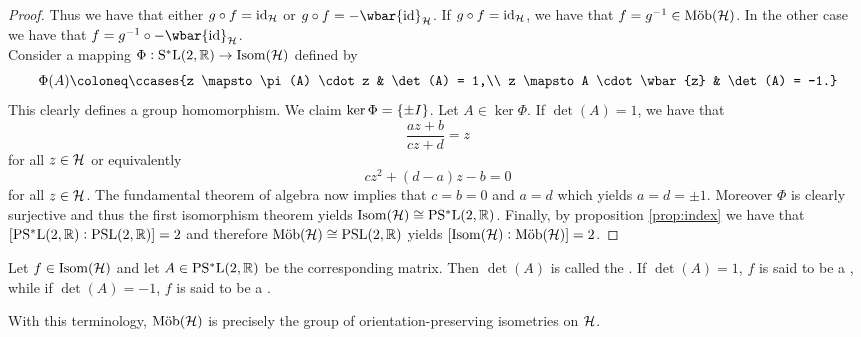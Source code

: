 \begin{proof}
	Thus we have that either $g \circ f = \operatorname{id}_{\mathcal{H}}$ or $g \circ f = -\wbar{\id}_\Hcal$. If $g \circ f = \operatorname{id}_{\mathcal{H}}$, we have that $f = g^{-1} \in \mathrm{M\ddot{o}b}(\mathcal{H})$. In the other case we have that $f = g^{-1} \circ -\wbar{\id}_\Hcal$.\\
	Consider a mapping $\Phi : \mathrm{S^*L}(2,\mathbb{R}) \to \mathrm{Isom}(\mathcal{H})$ defined by 
	\begin{equation*}
		\Phi(A) \coloneq \ccases{z \mapsto \pi(A) \cdot z & \det(A) = 1,\\
			z \mapsto A \cdot \wbar{z} & \det(A) = -1.}
	\end{equation*}
	This clearly defines a group homomorphism. We claim $\ker \Phi = \cbr[0]{\pm I}$. Let $A \in \ker \Phi$. If $\det(A) = 1$, we have that 
	\begin{equation*}
		\frac{az + b}{cz + d} = z
	\end{equation*}
	\noindent for all $z \in \mathcal{H}$ or equivalently
	\begin{equation*}
		cz^2 + (d - a)z - b = 0
	\end{equation*}
	\noindent for all $z \in \mathcal{H}$. The fundamental theorem of algebra now implies that $c = b = 0$ and $a = d$ which yields $a = d = \pm 1$. Moreover $\Phi$ is 
	clearly surjective and thus the first isomorphism theorem \cite[23]{grillet:abstract_algebra:2007} yields $\mathrm{Isom}(\mathcal{H}) \cong \mathrm{PS^*L}(2,\mathbb{R})$. Finally, by proposition \ref{prop:index} we have that $\sbr[0]{\PSLrmstar(2,\Rbb) : \PSLrm(2,\Rbb)} = 2$ and therefore $\mathrm{M\ddot{o}b}(\mathcal{H}) \cong \mathrm{PSL}(2,\mathbb{R})$ yields $\sbr[0]{\Isom(\Hcal) : \Mob(\Hcal)} = 2$.
\end{proof}

\begin{definition}
	Let $f \in \mathrm{Isom}(\mathcal{H})$ and let $A \in \mathrm{PS^*L}(2,\mathbb{R})$ be the corresponding matrix. Then $\det(A)$ is called the . If $\det(A) = 1$, $f$ is said to be a , while if $\det(A) = -1$, $f$ is said to be a .
\end{definition}

\begin{remark}
	With this terminology, $\mathrm{M\ddot{o}b}(\mathcal{H})$ is precisely the group of orientation-preserving isometries on $\mathcal{H}$.
\end{remark}

\printbibliography


